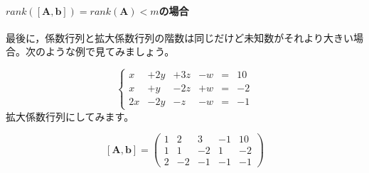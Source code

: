 \documentclass{ltjsbook}
\begin{document}
\paragraph{$ rank([\bm{A},\bm{b}]) = rank(\bm{A}) < m$の場合}
最後に，係数行列と拡大係数行列の階数は同じだけど未知数がそれより大きい場合。次のような例で見てみましょう。

\[
	\left \{
	\begin{array}{cccccc}
		x  & +2y & +3z & -w & = & 10 \\
		x  & +y  & -2z & +w & = & -2 \\
		2x & -2y & -z  & -w & = & -1
	\end{array}
	\right .
\]
拡大係数行列にしてみます。

\[
	[\bm{A},\bm{b}] =
	\begin{pmatrix}
		1 & 2  & 3  & -1 & 10 \\
		1 & 1  & -2 & 1  & -2 \\
		2 & -2 & -1 & -1 & -1
	\end{pmatrix}
\]
\end{document}
